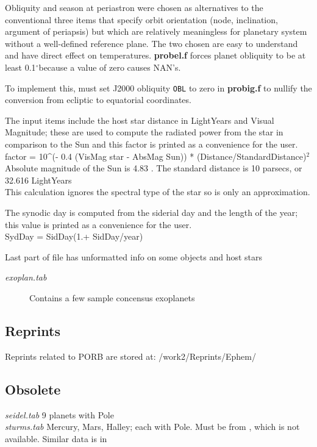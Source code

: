 \documentclass[draft]{article}
\newcommand{\qi}{\\ \hspace*{2.em}}      %
\newcommand{\qd}{$^\circ$}        %
\newcommand{\np}{\textbf}  %
\newcommand{\nf}{\textit}  %
\newcommand{\nv}{\texttt}  %
\begin{document}
Obliquity and season at periastron were chosen as alternatives to the
conventional three items that specify orbit orientation (node, inclination,
argument of periapsis) but which are relatively meaningless for planetary system
without a well-defined reference plane.  The two chosen are easy to understand
and have direct effect on temperatures.  \np{probel.f} forces planet obliquity to
be at least 0.1\qd because a value of zero causes NAN's.

To implement this, must set J2000 obliquity \nv{OBL} to zero in \np{probig.f} to nullify the conversion from ecliptic to equatorial coordinates. 

The input items include the host star distance in LightYears and Visual Magnitude;  these are used to compute the radiated power from the star in comparison to the Sun and this factor is printed as a convenience for the user.
\\ factor = 10\^{ }(- 0.4 (VisMag star - AbsMag Sun)) * (Distance/StandardDistance)$^2$ 
\qi Absolute magnitude of the Sun is 4.83 . The standard distance is 10 parsecs, or 32.616 LightYears
\\ This calculation ignores the spectral type of the star so is only an approximation.

\vspace{3.mm}
The synodic day is computed from the siderial day and the length of the year; this value is printed as a convenience for the user.
\\ SydDay = SidDay(1.+ SidDay/year)

Last part of file has unformatted info on some objects and host stars

\begin{description} 
 \item [\textit{exoplan.tab}] Contains a few sample concensus exoplanets
\end{description}

\subsection{Reprints}

Reprints related to PORB are stored at: /work2/Reprints/Ephem/

\subsection{Obsolete}
\nf{seidel.tab}    \cite{Seidelmann74} 9 planets with Pole
\\ \nf{sturms.tab} Mercury, Mars, Halley; each with Pole. Must be from \cite{Sturms71}, which is not available. Similar data is in \cite{Melbourne68}
\end{document}
